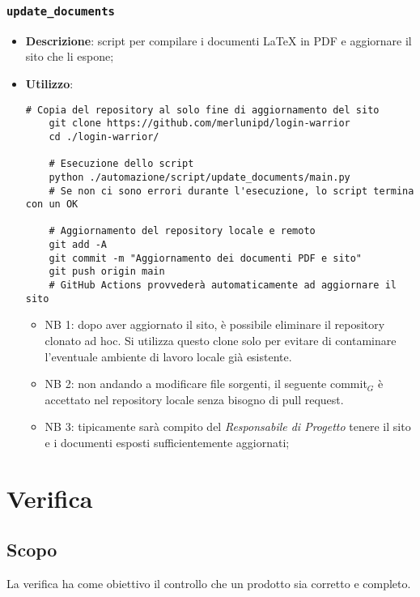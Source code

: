 \subsubsection{\texttt{update\_documents}}
\begin{itemize}
    \item \textbf{Descrizione}: script per compilare i documenti \LaTeX{} in PDF e aggiornare il sito che li espone;
    \item \textbf{Utilizzo}:

    \begin{Verbatim}[fontsize=\small]
    # Copia del repository al solo fine di aggiornamento del sito
    git clone https://github.com/merlunipd/login-warrior
    cd ./login-warrior/

    # Esecuzione dello script
    python ./automazione/script/update_documents/main.py
    # Se non ci sono errori durante l'esecuzione, lo script termina con un OK

    # Aggiornamento del repository locale e remoto
    git add -A
    git commit -m "Aggiornamento dei documenti PDF e sito"
    git push origin main
    # GitHub Actions provvederà automaticamente ad aggiornare il sito
    \end{Verbatim}

    \begin{itemize}
        \item NB 1: dopo aver aggiornato il sito, è possibile eliminare il repository clonato ad hoc. Si utilizza questo clone solo per evitare di contaminare l'eventuale ambiente di lavoro locale già esistente.
        \item  NB 2: non andando a modificare file sorgenti, il seguente commit$_G$ è accettato nel repository locale senza bisogno di pull request.
        \item NB 3: tipicamente sarà compito del \textit{Responsabile di Progetto} tenere il sito e i documenti esposti sufficientemente aggiornati;
    \end{itemize}
\end{itemize}


\section{Verifica}
\subsection{Scopo}
La verifica ha come obiettivo il controllo che un prodotto sia corretto e completo.

